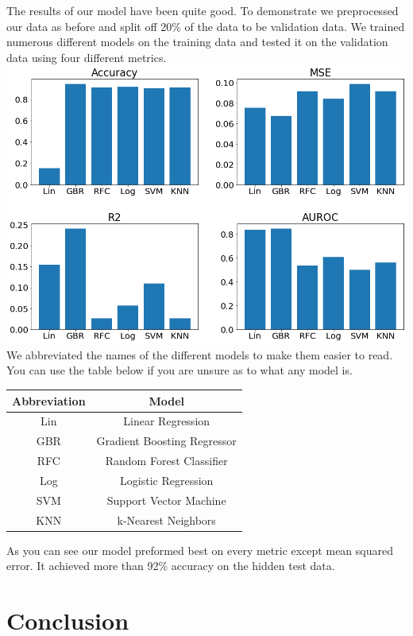 \documentclass{article}
\begin{document}
The results of our model have been quite good. To demonstrate we preprocessed our data as before and split off 20\% of the data to be validation data. We trained numerous different models on the training data and tested it on the validation data using four different metrics. 
\includegraphics[width=\linewidth]{FinalResults.png}
We abbreviated the names of the different models to make them easier to read. You can use the table below if you are unsure as to what any model is. 

\begin{tabular}{|c|c|}
    \hline
    Abbreviation & Model\\
    \hline
    Lin & Linear Regression\\
    GBR & Gradient Boosting Regressor\\
    RFC & Random Forest Classifier\\
    Log & Logistic Regression\\
    SVM & Support Vector Machine\\
    KNN & k-Nearest Neighbors\\
    \hline
\end{tabular}

As you can see our model preformed best on every metric except mean squared error. It achieved more than 92\% accuracy on the hidden test data. 

\section{Conclusion}
\end{document}
